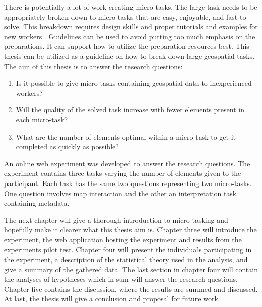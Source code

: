 There is potentially a lot of work creating micro-tasks. The large task needs to be appropriately broken down to micro-tasks that are easy, enjoyable, and fast to solve. This breakdown requires design skills and proper tutorials and examples for new workers \citep{Schulze2012}. 
Guidelines can be used to avoid putting too much emphasis on the preparations. It can support how to utilize the preparation resources best. This thesis can be utilized as a guideline on how to break down large geospatial tasks.\\

The aim of this thesis is to answer the research questions: 
\begin{enumerate}
	\item Is it possible to give micro-tasks containing geospatial data to inexperienced workers?
	\item Will the quality of the solved task increase with fewer elements present in each micro-task?
	\item What are the number of elements optimal within a micro-task to get it completed as quickly as possible?
\end{enumerate}
\vspace{0.3cm}
An online web experiment was developed to answer the research questions. The experiment contains three tasks varying the number of elements given to the participant. Each task has the same two questions representing two micro-tasks. One question involves map interaction and the other an interpretation task containing metadata. 

The next chapter will give a thorough introduction to micro-tasking and hopefully make it clearer what this thesis aim is. Chapter three will introduce the experiment, the web application hosting the experiment and results from the experiments pilot test. Chapter four will present the individuals participating in the experiment, a description of the statistical theory used in the analysis, and give a summary of the gathered data. The last section in chapter four will contain the analyses of hypotheses which in sum will answer the research questions. Chapter five contains the discussion, where the results are summed and discussed. At last, the thesis will give a conclusion and proposal for future work.
 
